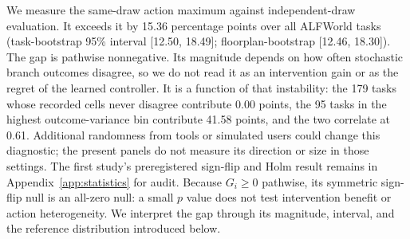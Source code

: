 We measure the same-draw action maximum against independent-draw evaluation. It exceeds it by 15.36 percentage points over all ALFWorld tasks (task-bootstrap 95\% interval [12.50, 18.49]; floorplan-bootstrap [12.46, 18.30]). The gap is pathwise nonnegative. Its magnitude depends on how often stochastic branch outcomes disagree, so we do not read it as an intervention gain or as the regret of the learned controller. It is a function of that instability: the 179 tasks whose recorded cells never disagree contribute 0.00 points, the 95 tasks in the highest outcome-variance bin contribute 41.58 points, and the two correlate at 0.61. Additional randomness from tools or simulated users could change this diagnostic; the present panels do not measure its direction or size in those settings. The first study's preregistered sign-flip and Holm result remains in Appendix~\ref{app:statistics} for audit. Because $G_i\geq0$ pathwise, its symmetric sign-flip null is an all-zero null: a small $p$ value does not test intervention benefit or action heterogeneity. We interpret the gap through its magnitude, interval, and the reference distribution introduced below.

